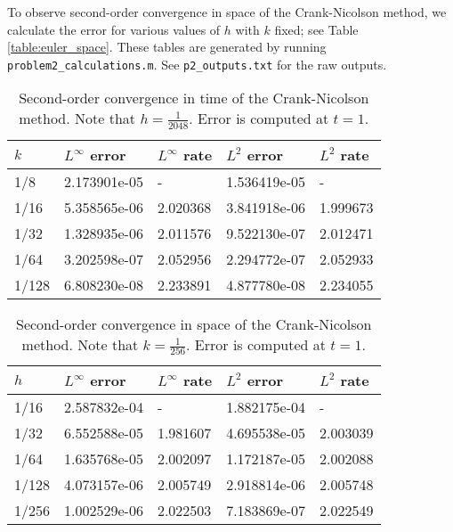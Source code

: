 \documentclass{homework}
\begin{document}
\begin{alphaparts}
		To observe second-order convergence in space of the Crank-Nicolson method, we calculate the error for various values of $h$ with $k$ fixed; see Table \ref{table:euler_space}. These tables are generated by running \verb*|problem2_calculations.m|. See \verb*|p2_outputs.txt| for the raw outputs.
		\begin{table}[h]
			\centering
			\begin{tabular}{@{}lllll@{}}
				\toprule
				$k$ & $L^\infty$ error & $L^\infty$ rate & $L^2$ error & $L^2$ rate \\
				\midrule
				1/8	&2.173901e-05&	-	&1.536419e-05&	-\\
				1/16&	5.358565e-06&	2.020368&	3.841918e-06&	1.999673\\
				1/32&	1.328935e-06&	2.011576&	9.522130e-07&	2.012471\\
				1/64&	3.202598e-07&	2.052956&	2.294772e-07&	2.052933\\
				1/128&	6.808230e-08&	2.233891&	4.877780e-08&	2.234055\\
				\bottomrule
			\end{tabular}
			\caption{Second-order convergence in time of the Crank-Nicolson method. Note that $h=\frac{1}{2048}$. Error is computed at $t =1$.}
			\label{table:cn_time}
		\end{table}
		
		\begin{table}[h]
			\centering
			\begin{tabular}{@{}lllll@{}}
				\toprule
				$h$ & $L^\infty$ error & $L^\infty$ rate & $L^2$ error & $L^2$ rate \\
				\midrule
				1/16&	2.587832e-04	&-	&1.882175e-04&	-\\
				1/32&	6.552588e-05	&1.981607&	4.695538e-05&	2.003039\\
				1/64&	1.635768e-05	&2.002097&	1.172187e-05&	2.002088\\
				1/128&	4.073157e-06	&2.005749&	2.918814e-06&	2.005748\\
				1/256&	1.002529e-06	&2.022503&	7.183869e-07&	2.022549\\
				\bottomrule
			\end{tabular}
			\caption{Second-order convergence in space of the Crank-Nicolson method. Note that $k = \frac{1}{256}$. Error is computed at $t =1$.}
			\label{table:cn_space}
		\end{table}
	\end{alphaparts}
	
	
\end{document}
